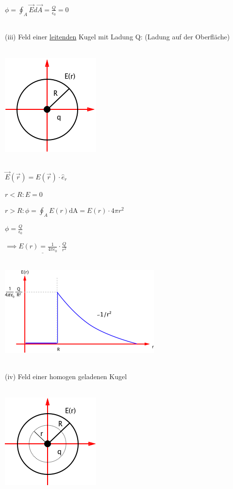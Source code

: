 \documentclass[11pt]{article}
\begin{document}
\hfill\\

$\phi=\oint_{A}\vec{E}d\vec{A}=\frac{Q}{\epsilon_0}=0$

\hfill\\

(iii) Feld einer \underline{leitenden} Kugel mit Ladung Q: (Ladung auf der Oberfläche)

\hfill\\

\includegraphics{skizzen/14/14_6B4}

\hfill\\

$ \vec{E}(\vec{r})= E(\vec{r})\cdot\hat{e}_r $

$ r<R: E=0 $

$ r>R: \phi=\oint_{A}E(r)\mathrm{dA}=E(r)\cdot4\pi r^2 $

$ \phi=\frac{Q}{\epsilon_0} $

$ \implies \underline{E(r)= \frac{1}{4\pi\epsilon_0}\cdot\frac{Q}{r^2}} $

\hfill\\

\includegraphics{skizzen/14/14_6B5}

\hfill\\

(iv) Feld einer homogen geladenen Kugel

\hfill\\

\includegraphics{skizzen/14/14_6B6}
\end{document}
